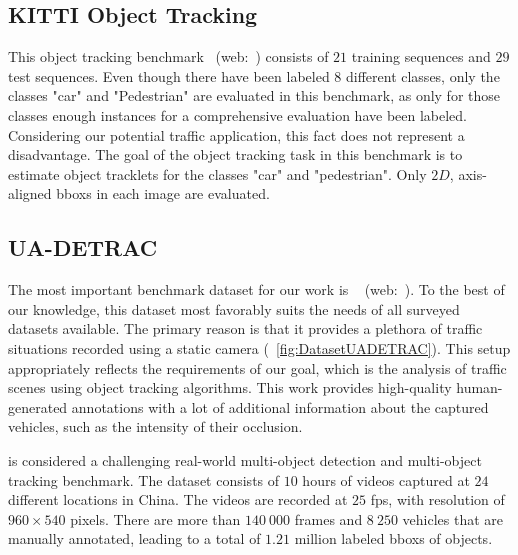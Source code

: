 \subsection{KITTI Object Tracking}
\label{ssec:DatasetKITTIObjectTracking}

This object tracking benchmark~\cite{geiger2012cvpr} (web:~\cite{webkittiobjtrackingdataset}) consists of $21$ training sequences and $29$ test sequences. Even though there have been labeled $8$ different classes, only the classes "car" and "Pedestrian" are evaluated in this benchmark, as only for those classes enough instances for a comprehensive evaluation have been labeled. Considering our potential traffic application, this fact does not represent a disadvantage. The goal of the object tracking task in this benchmark is to estimate object tracklets for the classes "car" and "pedestrian". Only $2D$, axis-aligned \glspl{bbox} in each image are evaluated.

\subsection{UA-DETRAC}
\label{ssec:DatasetUADETRAC}

The most important benchmark dataset for our work is \uadetrac{}~\cite{wen2020uadetrac} (web:~\cite{webuadetracdataset}). To the best of our knowledge, this dataset most favorably suits the needs of all surveyed datasets available. The primary reason is that it provides a plethora of traffic situations recorded using a static camera (\figtext{}~\ref{fig:DatasetUADETRAC}). This setup appropriately reflects the requirements of our goal, which is the analysis of traffic scenes using object tracking algorithms. This work provides high-quality human-generated annotations with a lot of additional information about the captured vehicles, such as the intensity of their occlusion.

\uadetrac{} is considered a challenging real-world multi-object detection and multi-object tracking benchmark. The dataset consists of $10$ hours of videos captured at $24$ different locations in China. The videos are recorded at $25$ \gls{fps}, with resolution of $960 \times 540$ pixels. There are more than $140\ 000$ frames and $8\ 250$ vehicles that are manually annotated, leading to a total of $1.21$ million labeled \glspl{bbox} of objects.

